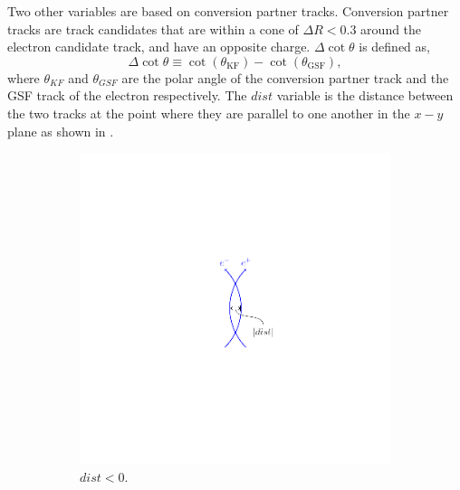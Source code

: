 Two other variables are based on conversion partner tracks.
Conversion partner tracks are track candidates that are within a cone of $\Delta
R < 0.3$ around the electron candidate track, and have an opposite charge. 
$\Delta\cot\theta$ is defined as,
\begin{equation}
\Delta \cot \theta \equiv \cot(\theta_{\text{KF}}) - \cot(\theta_{\text{{GSF}}}),
\end{equation}
where $\theta_{KF}$ and $\theta_{{GSF}}$ are the polar angle of the conversion
partner track and the {GSF} track of the electron respectively.
The $dist$ variable is the distance between the two tracks at the point where
they are parallel to one another in the $x-y$ plane as shown in
 \cite{baffioni2009identification,barge2009conversion}.
\begin{figure}[htbp]
  \centering
  \begin{subfigure}{0.45\textwidth}
    \centering
    \includegraphics[trim = 40mm 40mm 40mm 40mm, clip,width=\textwidth]{dist_m}
    \caption{$dist<0$.}
    \label{fig:dist_m}
  \end{subfigure}
  \begin{subfigure}{0.45\textwidth}
    \centering

\end{subfigure}
\end{figure}
